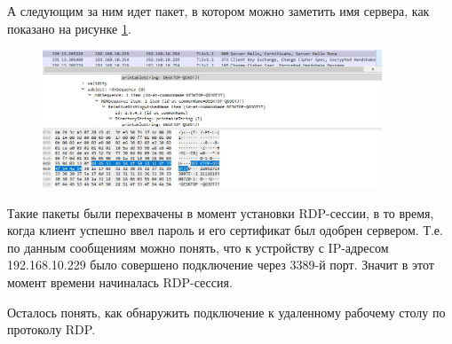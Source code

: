 \documentclass[bachelor, och, coursework]{SCWorks}
\begin{document}
  А следующим за ним идет пакет, в котором можно заметить имя сервера, как показано на рисунке \ref{serv-hello}.

  \begin{figure}[H]
    \centering
    \includegraphics[width=0.9\textwidth]{photo/serv-hello.jpg}
    \caption{}
    \label{serv-hello}
  \end{figure}

  Такие пакеты были перехвачены в момент установки RDP-сессии, в то время, когда клиент успешно ввел пароль и его сертификат
  был одобрен сервером. Т.е. по данным сообщениям можно понять, что к устройству с IP-адресом 192.168.10.229 было совершено
  подключение через 3389-й порт. Значит в этот момент времени начиналась RDP-сессия.
  
  Осталось понять, как обнаружить подключение к удаленному рабочему столу по протоколу RDP.


  
\end{document}
